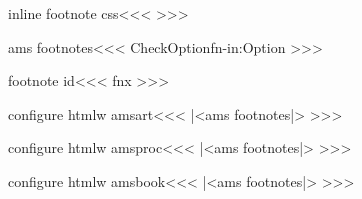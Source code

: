 \<inline footnote css\><<<
>>>


\<ams footnotes\><<<
\:CheckOption{fn-in}\if:Option  
\fi
>>>


\<footnote id\><<<
fn\FNnum x\minipageNum
>>>


\<configure htmlw amsart\><<<
|<ams footnotes|>
>>>

\<configure htmlw amsproc\><<<
|<ams footnotes|>
>>>

\<configure htmlw amsbook\><<<
|<ams footnotes|>
>>>


\endinput
